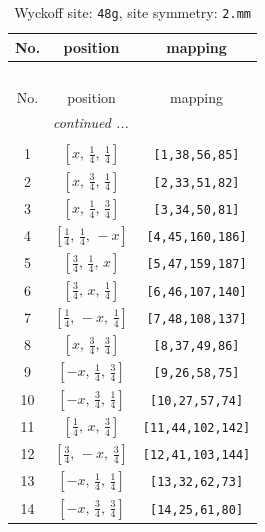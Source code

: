 \documentclass[fleqn,8pt]{jsarticle}
\begin{document}
\begin{longtable}{ccc}
\caption{Wyckoff site: {\tt 48g}, site symmetry: {\tt 2.mm}}
 \\
 \hline \hline
No. & position & mapping \\ \hline \endfirsthead

\multicolumn{2}{l}{\tablename\ \thetable{}} \\
 \hline \hline
No. & position & mapping \\ \hline \endhead

 \hline \hline
\multicolumn{2}{r}{\footnotesize\it continued ...} \\ \endfoot

 \hline \hline
\multicolumn{2}{r}{} \\ \endlastfoot

1 & $\left[ x,\, \frac{1}{4},\, \frac{1}{4} \right]$ & {\tt [1,38,56,85]} \\ \hline
2 & $\left[ x,\, \frac{3}{4},\, \frac{1}{4} \right]$ & {\tt [2,33,51,82]} \\ \hline
3 & $\left[ x,\, \frac{1}{4},\, \frac{3}{4} \right]$ & {\tt [3,34,50,81]} \\ \hline
4 & $\left[ \frac{1}{4},\, \frac{1}{4},\, - x \right]$ & {\tt [4,45,160,186]} \\ \hline
5 & $\left[ \frac{3}{4},\, \frac{1}{4},\, x \right]$ & {\tt [5,47,159,187]} \\ \hline
6 & $\left[ \frac{3}{4},\, x,\, \frac{1}{4} \right]$ & {\tt [6,46,107,140]} \\ \hline
7 & $\left[ \frac{1}{4},\, - x,\, \frac{1}{4} \right]$ & {\tt [7,48,108,137]} \\ \hline
8 & $\left[ x,\, \frac{3}{4},\, \frac{3}{4} \right]$ & {\tt [8,37,49,86]} \\ \hline
9 & $\left[ - x,\, \frac{1}{4},\, \frac{3}{4} \right]$ & {\tt [9,26,58,75]} \\ \hline
10 & $\left[ - x,\, \frac{3}{4},\, \frac{1}{4} \right]$ & {\tt [10,27,57,74]} \\ \hline
11 & $\left[ \frac{1}{4},\, x,\, \frac{3}{4} \right]$ & {\tt [11,44,102,142]} \\ \hline
12 & $\left[ \frac{3}{4},\, - x,\, \frac{3}{4} \right]$ & {\tt [12,41,103,144]} \\ \hline
13 & $\left[ - x,\, \frac{1}{4},\, \frac{1}{4} \right]$ & {\tt [13,32,62,73]} \\ \hline
14 & $\left[ - x,\, \frac{3}{4},\, \frac{3}{4} \right]$ & {\tt [14,25,61,80]} \\ \hline

\end{longtable}
\end{document}
